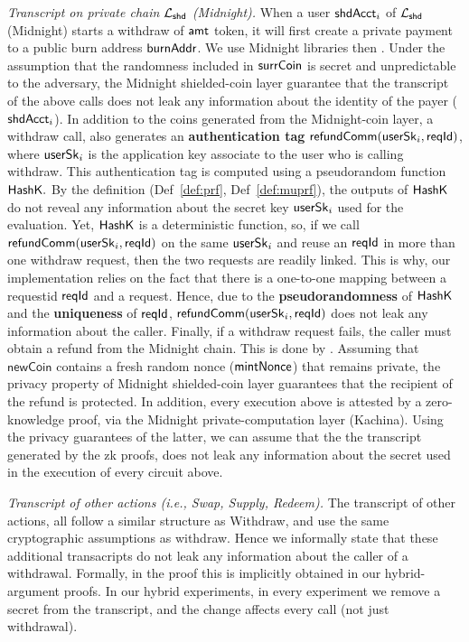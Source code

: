 \vspace{5pt}
\emph{Transcript on private chain $\mathcal{L}_{\mathsf{shd}}$ (Midnight).}
When a user $\mathsf{shdAcct}_i$ of  $\mathcal{L}_{\mathsf{shd}}$ (Midnight) starts a withdraw of $\mathsf{amt}$ token,  it will first create a private payment to a public burn address $\mathsf{burnAddr}$.
We use Midnight libraries  then
.
Under the assumption that the randomness included in $\mathsf{surrCoin}$ is secret and unpredictable to the adversary, the  Midnight shielded-coin layer guarantee that the transcript of the above calls does not leak any information about the identity of the payer ($\mathsf{shdAcct}_i $).
In addition to the coins generated from the Midnight-coin layer, a withdraw call, also generates an \textbf{authentication tag} $\mathsf{refundComm}(\mathsf{userSk}_i,\mathsf{reqId})$, where $\mathsf{userSk}_i$ is the application key associate to the user who is calling withdraw.  This authentication tag is computed using a pseudorandom function $\mathsf{HashK}. $ By the definition (Def~\ref{def:prf}, Def~\ref{def:muprf}), the outputs of $\mathsf{HashK}$ do not reveal any information about the secret key $\mathsf{userSk}_i$ used for the evaluation.
Yet, $\mathsf{HashK}$ is a deterministic function, so, if we call $\mathsf{refundComm}(\mathsf{userSk}_i,\mathsf{reqId})$ on the same $\mathsf{userSk}_i$ and reuse an  $\mathsf{reqId}$ in more than one withdraw request, then the two requests are readily linked.
This is why,  our implementation relies on the fact that there is a one-to-one mapping between a requestid $\mathsf{reqId}$ and a request.
Hence, due to the  \textbf{pseudorandomness} of $\mathsf{HashK}$ and the  \textbf{uniqueness} of $\mathsf{reqId}$, $\mathsf{refundComm}(\mathsf{userSk}_i,\mathsf{reqId})$ does not leak any information about the caller.
Finally, if a withdraw request fails, the caller must obtain a refund from the Midnight chain.
This is done by  . Assuming that $\mathsf{newCoin}$ contains a fresh random nonce  ($\mathsf{mintNonce}$) that remains private, the privacy property of Midnight shielded-coin layer guarantees that
the recipient of the refund is protected.
In addition, every execution above is attested by a zero-knowledge proof, via the Midnight private-computation layer (Kachina).
Using the privacy guarantees of the latter, we can assume that the the transcript generated by the zk proofs, does not leak any information about the secret used in the execution of every circuit above.


\vspace{5pt}
\emph{Transcript of other actions (i.e., Swap, Supply, Redeem).}
The transcript of other actions, all follow a similar structure as Withdraw, and use the same cryptographic assumptions as withdraw. Hence we informally state that these additional transacripts do not leak any information about the caller of a withdrawal.
Formally, in the proof this is implicitly obtained in our hybrid-argument proofs.
In our hybrid experiments, in every experiment we remove a secret from the transcript, and the change affects every call (not just withdrawal).


